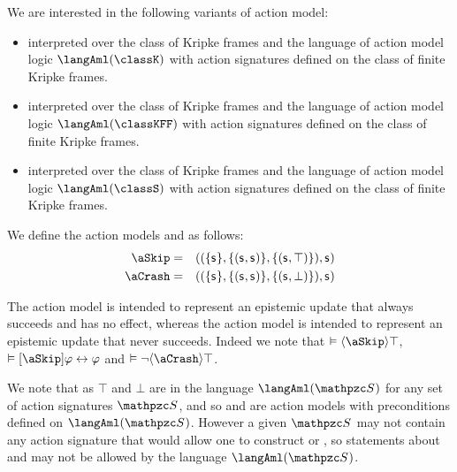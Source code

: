 We are interested in the following variants of action model:
\begin{itemize}
    \item \logicAmlK{} interpreted over the class of \classK{} Kripke frames and the language of action model logic $\langAml(\classK)$ with action signatures defined on the class of finite \classK{} Kripke frames.
    \item \logicAmlKFF{} interpreted over the class of \classKFF{} Kripke frames and the language of action model logic $\langAml(\classKFF)$ with action signatures defined on the class of finite \classKFF{} Kripke frames.
    \item \logicAmlS{} interpreted over the class of \classS{} Kripke frames and the language of action model logic $\langAml(\classS)$ with action signatures defined on the class of finite \classS{} Kripke frames.
\end{itemize}

\begin{definition}
    We define the action models \aSkip{} and \aCrash{} as follows:
    \begin{eqnarray*}
        \aSkip &=& ((\{\aStateS\}, \{(\aStateS, \aStateS)\}, \{(\aStateS, \top)\}), \aStateS)\\
        \aCrash &=& ((\{\aStateS\}, \{(\aStateS, \aStateS)\}, \{(\aStateS, \bot)\}), \aStateS)
    \end{eqnarray*}
\end{definition}

The action model \aSkip{} is intended to represent an epistemic update that always succeeds and has no effect,
whereas the action model \aCrash{} is intended to represent an epistemic update that never succeeds.
Indeed we note that $\entails \actionE{\aSkip} \top$, $\entails \actionA{\aSkip} \phi \iff \phi$ and $\entails \lnot \actionE{\aCrash} \top$.

We note that as $\top$ and $\bot$ are in the language $\langAml(\aSignatureFamily)$ for any set of action signatures $\aSignatureFamily$, and so \aSkip{} and \aCrash{} are action models with preconditions defined on $\langAml(\aSignatureFamily)$.
However a given $\aSignatureFamily$ may not contain any action signature that would allow one to construct \aSkip{} or \aCrash{}, so statements about \aSkip{} and \aCrash{} may not be allowed by the language $\langAml(\aSignatureFamily)$.

